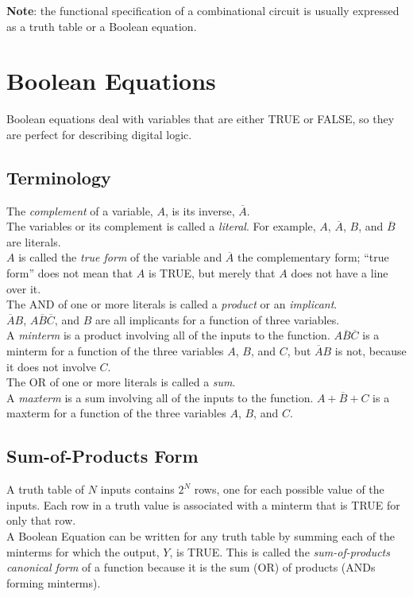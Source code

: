 \documentclass[12pt]{article}
\theoremstyle{definition}
\begin{document}
  \textbf{Note}: the functional specification of a combinational circuit is usually expressed as a truth table or a Boolean equation.

  \newpage
  \section{Boolean Equations}
  Boolean equations deal with variables that are either TRUE or FALSE, so they are perfect for describing digital logic.

  \subsection{Terminology}
  The \emph{complement} of a variable, $A$, is its inverse, $\overline{A}$. \\
  The variables or its complement is called a \emph{literal}.
  For example, $A$, $\overline{A}$, $B$, and $\overline{B}$ are literals. \\
  $A$ is called the \emph{true form} of the variable and $\overline{A}$ the complementary form; ``true form'' does not mean that $A$ is TRUE, but merely that $A$ does not have a line over it. \\

  The AND of one or more literals is called a \emph{product} or an \emph{implicant}. \\
  $\overline{A}B$, $A\overline{B} \overline{C}$, and $B$ are all implicants for a function of three variables. \\
  A \emph{minterm} is a product involving all of the inputs to the function.
  $A\overline{B}\overline{C}$ is a minterm for a function of the three variables $A$, $B$, and $C$, but $\overline{A}B$ is not, because it does not involve $C$. \\

  The OR of one or more literals is called a \emph{sum}. \\
  A \emph{maxterm} is a sum involving all of the inputs to the function.
  $A + \overline{B} + C$ is a maxterm for a function of the three variables $A$, $B$, and $C$.

  \subsection{Sum-of-Products Form}
  A truth table of $N$ inputs contains $2^{N}$ rows, one for each possible value of the inputs.
  Each row in a truth value is associated with a minterm that is TRUE for only that row. \\
  A Boolean Equation can be written for any truth table by summing each of the minterms for which the output, $Y$, is TRUE.
  This is called the \emph{sum-of-products canonical form} of a function because it is the sum (OR) of products (ANDs forming minterms). \\
\end{document}

